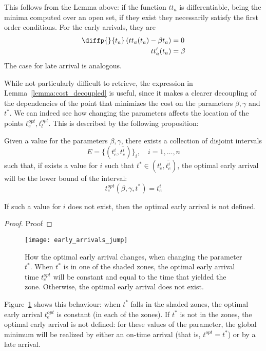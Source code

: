 This follows from the Lemma above:
if the function \(tt_a\) is differentiable, being the minima computed over an open set,
if they exist they necessarily satisfy the first order conditions.
For the early arrivals, they are
\begin{align*}
  \diffp{}{{t_a}} \left(tt_a(t_a) - \beta t_a\right) & = 0 \\
  tt_a'(t_a) & = \beta
\end{align*}
The case for late arrival is analogous.

While not particularly difficult to retrieve,
the expression in Lemma~\ref{lemma:cost_decoupled} is useful,
since it makes a clearer decoupling of the dependencies of the point that minimizes the cost on the parameters \(\beta, \gamma\) and \(t^*\).
We can indeed see how changing the parameters affects the location of the points \(t_e^{opt}, t_l^{opt}\).
This is described by the following proposition:
\begin{prop}
  Given a value for the parameters \(\beta, \gamma\),
  there exists a collection of disjoint intervals
  \begin{equation*}
    E = \{(t_e^i, \bar{t_e^i})\}_i,\quad i = 1, \dots, n
  \end{equation*}
  such that, if exists a value for \(i\) such that \(t^* \in (t_e^i, \bar{t_e^i})\),
  the optimal early arrival will be the lower bound of the interval:
  \begin{equation*}
    t_e^{opt}(\beta, \gamma, t^*) = t_e^{i}
  \end{equation*}

  If such a value for \(i\) does not exist,
  then the optimal early arrival is not defined.
\end{prop}

\begin{proof}
  Proof
\end{proof}

\begin{figure}
  \centering
  \texttt{[image: early\_arrivals\_jump]}
  \caption{How the optimal early arrival changes,
    when changing the parameter \(t^*\).
    When \(t^*\) is in one of the shaded zones,
    the optimal early arrival time \(t_e^{opt}\) will be constant and equal to the time that yielded the zone.
  Otherwise, the optimal early arrival does not exist.}
  \label{fig:early_arrivals_jump}
\end{figure}

Figure~\ref{fig:early_arrivals_jump} shows this behaviour:
when \(t^*\) falls in the shaded zones,
the optimal early arrival \(t_e^{opt}\) is constant (in each of the zones).
If \(t^*\) is not in the zones,
the optimal early arrival is not defined:
for these values of the parameter,
the global minimum will be realized by either an on-time arrival (that is, \(t^{opt} = t^*\))
or by a late arrival.

